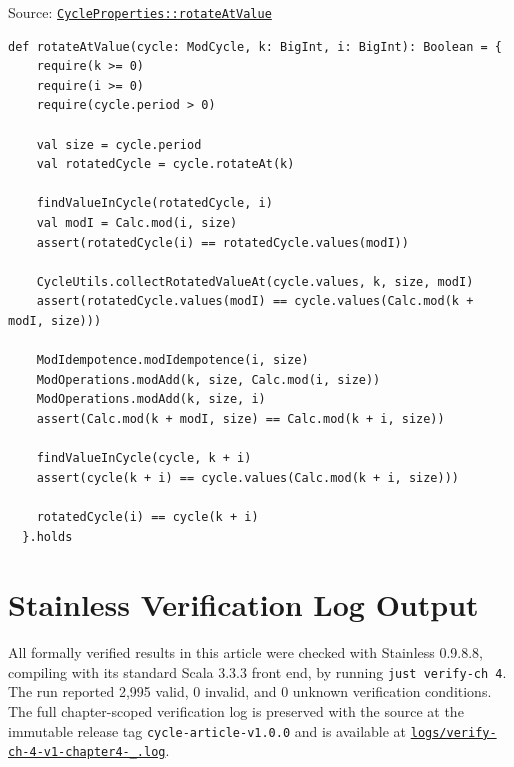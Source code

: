 Source:
\href{https://github.com/thiagomata/prime-numbers/blob/cycle-article-v1.0.0/src/main/scala/v1/chapter4/cycle/properties/CycleProperties.scala}{\texttt{CycleProperties::rotateAtValue}}

\begin{lstlisting}[style=scala]
  def rotateAtValue(cycle: ModCycle, k: BigInt, i: BigInt): Boolean = {
    require(k >= 0)
    require(i >= 0)
    require(cycle.period > 0)

    val size = cycle.period
    val rotatedCycle = cycle.rotateAt(k)

    findValueInCycle(rotatedCycle, i)
    val modI = Calc.mod(i, size)
    assert(rotatedCycle(i) == rotatedCycle.values(modI))

    CycleUtils.collectRotatedValueAt(cycle.values, k, size, modI)
    assert(rotatedCycle.values(modI) == cycle.values(Calc.mod(k + modI, size)))

    ModIdempotence.modIdempotence(i, size)
    ModOperations.modAdd(k, size, Calc.mod(i, size))
    ModOperations.modAdd(k, size, i)
    assert(Calc.mod(k + modI, size) == Calc.mod(k + i, size))

    findValueInCycle(cycle, k + i)
    assert(cycle(k + i) == cycle.values(Calc.mod(k + i, size)))

    rotatedCycle(i) == cycle(k + i)
  }.holds
\end{lstlisting}

\section{Stainless Verification Log Output}
\label{sec:appendix-b}

All formally verified results in this article were checked with Stainless
0.9.8.8, compiling with its standard Scala 3.3.3 front end, by running
\texttt{just verify-ch 4}. The run reported 2,995 valid, 0 invalid, and 0
unknown verification conditions. The full chapter-scoped verification log is
preserved with the source at the immutable release tag
\texttt{cycle-article-v1.0.0} and is available at
\href{https://github.com/thiagomata/prime-numbers/blob/cycle-article-v1.0.0/logs/verify-ch-4-v1-chapter4-_.log}{\texttt{logs/verify-ch-4-v1-chapter4-\_.log}}.
